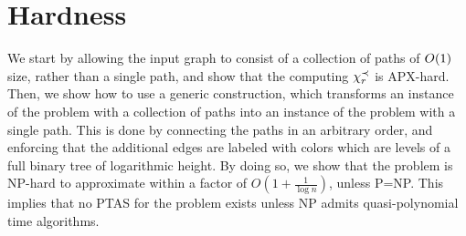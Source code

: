 \section{Hardness}
\label{sec:hardness}

We start by allowing the input graph to consist of a collection of paths of $O\mathopen{}\left( 1 \right)$ size, rather than a single path, and show that the computing $\chi_r^{\prec}$ is APX-hard. Then, we show how to use a generic construction, which transforms an instance of the problem with a collection of paths into an instance of the problem with a single path. This is done by connecting the paths in an arbitrary order, and enforcing that the additional edges are labeled with colors which are levels of a full binary tree of logarithmic height. By doing so, we show that the problem is NP-hard to approximate within a factor of $O(1+\frac{1}{\log n})$, unless P=NP. This implies that no PTAS for the problem exists unless NP admits quasi-polynomial time algorithms.

